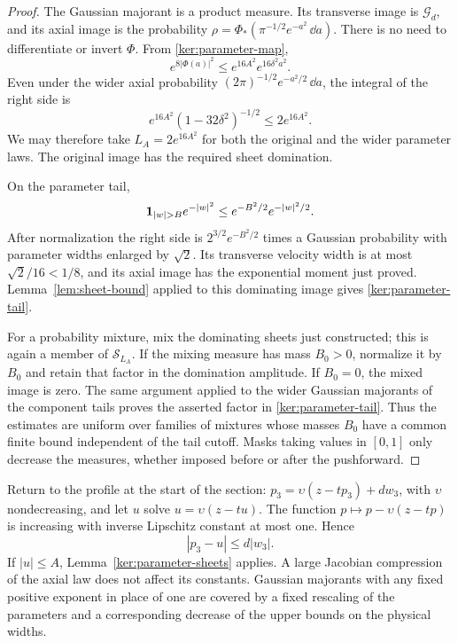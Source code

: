 \begin{proof}
The Gaussian majorant is a product measure. Its transverse image is
$\mathcal G_d$, and its axial image is the probability
$\rho=\Phi_*(\pi^{-1/2}e^{-a^2}\,\dd a)$. There is no need to
differentiate or invert $\Phi$. From \eqref{ker:parameter-map},
\[
 e^{8|\Phi(a)|^2}\leq e^{16A^2}e^{16\delta^2a^2}.
\]
Even under the wider axial probability
$(2\pi)^{-1/2}e^{-a^2/2}\,\dd a$, the integral of the right side
is
\[
 e^{16A^2}(1-32\delta^2)^{-1/2}\leq2e^{16A^2}.
\]
We may therefore take $L_A=2e^{16A^2}$ for both the original and
the wider parameter laws. The original image has the required
sheet domination.

On the parameter tail,
\[
 \ind_{|w|>B}e^{-|w|^2}
 \leq e^{-B^2/2}e^{-|w|^2/2}.
\]
After normalization the right side is $2^{3/2}e^{-B^2/2}$ times a
Gaussian probability with parameter widths enlarged by $\sqrt2$.
Its transverse velocity width is at most $\sqrt2/16<1/8$, and
its axial image has the exponential moment just proved.
Lemma~\ref{lem:sheet-bound} applied to this dominating image gives
\eqref{ker:parameter-tail}.

For a probability mixture, mix the dominating sheets just constructed;
this is again a member of $\mathcal S_{L_A}$. If the mixing measure
has mass $B_0>0$, normalize it by $B_0$ and retain that factor in
the domination amplitude. If $B_0=0$, the mixed image is zero.
The same argument applied to the wider Gaussian majorants of the
component tails proves the asserted factor in
\eqref{ker:parameter-tail}. Thus the estimates are uniform over
families of mixtures whose masses $B_0$ have a common finite bound
independent of the tail cutoff. Masks taking values in $[0,1]$ only
decrease the measures, whether imposed before or after the pushforward.
\end{proof}

Return to the profile at the start of the section:
$p_3=\upsilon(z-tp_3)+d w_3$, with $\upsilon$ nondecreasing, and
let $u$ solve $u=\upsilon(z-tu)$. The function
$p\mapsto p-\upsilon(z-tp)$ is increasing with inverse Lipschitz
constant at most one. Hence
\begin{equation}\label{ker:compressed-displacement}
 |p_3-u|\leq d|w_3|.
\end{equation}
If $|u|\leq A$, Lemma~\ref{ker:parameter-sheets} applies. A large
Jacobian compression of the axial law does not affect its constants.
Gaussian majorants with any fixed positive exponent in place of one
are covered by a fixed rescaling of the parameters and a corresponding
decrease of the upper bounds on the physical widths.

